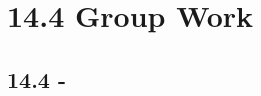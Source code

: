 \documentclass[12pt]{exam}
\newcommand{\qdate}{14.4 Group Work} %
\begin{document}
\section*{\qdate}


\subsection*{14.4 - }

\begin{questions}

\question 
    \ifprintanswers
        \begin{solution}
        \end{solution}
    \else
        \vfill
    \fi

    
\end{questions}
\end{document}
